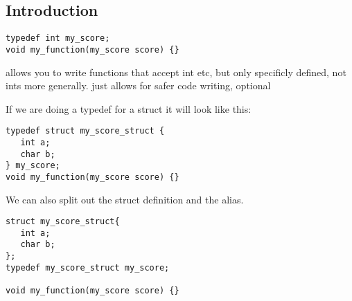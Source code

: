 
\subsection{Introduction}

\begin{verbatim}
typedef int my_score;
void my_function(my_score score) {}
\end{verbatim}

allows you to write functions that accept int etc, but only specificly defined, not ints more generally.
just allows for safer code writing, optional

If we are doing a typedef for a struct it will look like this:

\begin{verbatim}
typedef struct my_score_struct {
   int a;
   char b;
} my_score;
void my_function(my_score score) {}
\end{verbatim}

We can also split out the struct definition and the alias.

\begin{verbatim}
struct my_score_struct{
   int a;
   char b;
};
typedef my_score_struct my_score;

void my_function(my_score score) {}
\end{verbatim}

